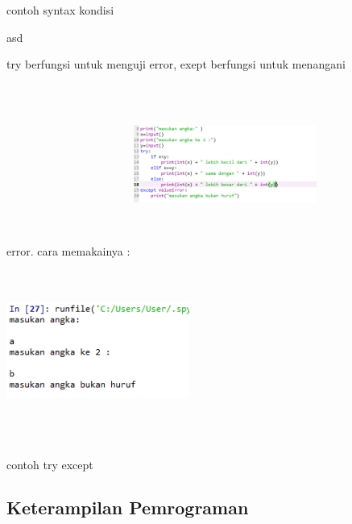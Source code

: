 \begin{enumerate}
\begin{figure}
\caption{contoh syntax kondisi}
\end{figure}
\begin{figure}
\item asd
\end{figure}
\begin{figure}
\item try berfungsi untuk menguji error, exept berfungsi untuk menangani error. cara memakainya :
\centering
\includegraphics[width=6cm,height=6cm]{figures/c8.png}
\includegraphics[width=6cm,height=6cm]{figures/c9.png}
\caption{contoh try except}
\end{figure}
\end{enumerate}
\begin{figure}
\subsection{Keterampilan Pemrograman}
\end{figure}
